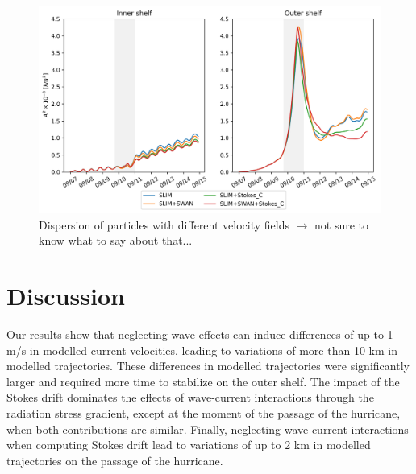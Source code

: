 \documentclass[preprint,12pt,authoryear]{elsarticle}
\begin{document}
\begin{figure}
    \centering
    \includegraphics[width=.98\textwidth]{fig/dispersion.png}
    \caption{Dispersion of particles with different velocity fields $\rightarrow$ not sure to know what to say about that...}   
    \label{fig:dispersion}
\end{figure}

\section{Discussion}

Our results show that neglecting wave effects can induce differences of up to 1 m/s in modelled current velocities, leading to variations of more than 10 km in modelled trajectories. These differences in modelled trajectories were significantly larger and required more time to stabilize on the outer shelf. The impact of the Stokes drift dominates the effects of wave-current interactions through the radiation stress gradient, except at  the moment of the passage of the hurricane, when both contributions are similar. Finally, neglecting wave-current interactions when computing Stokes drift lead to variations of up to 2 km in modelled trajectories on the passage of the hurricane.
\end{document}
